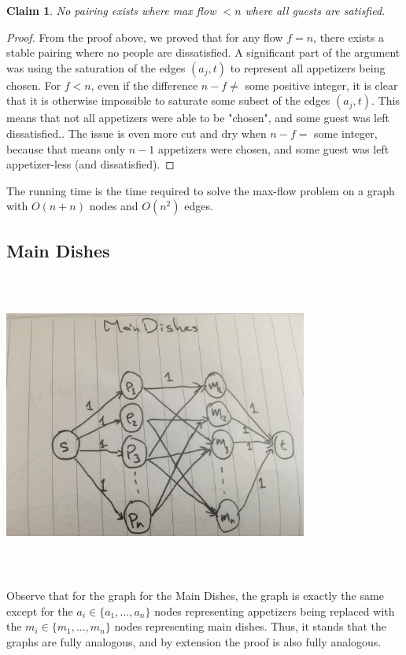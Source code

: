 \documentclass[11pt]{article}
\newtheorem{claim}[theorem]{Claim}
\begin{document}
\begin{claim}
No pairing exists where max flow $< n$ where all guests are satisfied.
\end{claim}
\begin{proof}
From the proof above, we proved that for any flow $f = n$, there exists a stable pairing where no people are dissatisfied. A significant part of the argument was using the saturation of the edges $(a_j, t)$ to represent all appetizers being chosen. For $f < n$, even if the difference $n-f \neq$ some positive integer, it is clear that it is otherwise impossible to saturate some subset of the edges $(a_j, t)$. This means that not all appetizers were able to be "chosen", and some guest was left dissatisfied.. The issue is even more cut and dry when $n-f =$ some integer, because that means only $n-1$ appetizers were chosen, and some guest was left appetizer-less (and dissatisfied). 
\end{proof}

The running time is the time required to solve the max-flow problem on a graph with $O(n+n)$ nodes and $O(n^2)$ edges.


\subsection*{Main Dishes}
\begin{center}
\includegraphics[width=10cm,height=10cm,keepaspectratio]{q2_maindishes}
\end{center}

Observe that for the graph for the Main Dishes, the graph is exactly the same except for the $a_i \in \{a_1,...,a_n\}$ nodes representing appetizers being replaced with the $m_i \in \{m_1, ..., m_n\}$ nodes representing main dishes. Thus, it stands that the graphs are fully analogous, and by extension the proof is also fully analogous.
\end{document}
